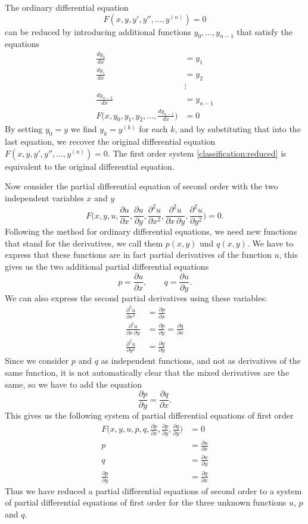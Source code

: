 The ordinary differential equation
\[
F(x,y,y',y'',\dots,y^{(n)})=0
\]
can be reduced by introducing additional functions 
$y_0,\dots,y_{n-1}$
that satisfy the equations
\begin{equation}
\begin{aligned}
\frac{dy_0}{dx}&=y_1\\
\frac{dy_1}{dx}&=y_2\\
&\vdots\\
\frac{dy_{n-2}}{dx}&=y_{n-1}\\
F\biggl(x,y_0,y_1,y_2,\dots,\frac{dy_{n-1}}{dx}\biggr)&=0
\end{aligned}
\label{classification:reduced}
\end{equation}
By setting $y_0=y$ we find
$y_k=y^{(k)}$ for each $k$, and by substituting that into the last
equation, we recover the original differential equation
$F(x,y,y',y'',\dots,y^{(n)})=0$.
The first order system \eqref{classification:reduced} is equivalent to the
original differential equation.

Now consider the partial differential equation of second order with
the two independent variables $x$ and $y$
\[
F\biggl(x,y,u,\frac{\partial u}{\partial x},\frac{\partial u}{\partial y},
\frac{\partial^2 u}{\partial x^2},\frac{\partial^2 u}{\partial x\,\partial y},
\frac{\partial^2u}{\partial y^2}\biggr)=0.
\]
Following the method for ordinary differential equations, we need new
functions that stand for the derivatives, we call them $p(x,y)$ und $q(x,y)$.
We have to express that these functions are in fact partial
derivatives of the function $u$, this gives us the two additional partial
differential equations
\[
p=\frac{\partial u}{\partial x},\qquad q=\frac{\partial u}{\partial y}.
\]
We can also express the second partial derivatives using these variables:
\begin{align*}
\frac{\partial^2 u}{\partial x^2}&=\frac{\partial p}{\partial x}\\
\frac{\partial^2 u}{\partial x\,\partial y}&=\frac{\partial p}{\partial y}=\frac{\partial q}{\partial x}\\
\frac{\partial^2 u}{\partial y^2}&=\frac{\partial q}{\partial y}
\end{align*}
Since we consider $p$ and $q$ as independent functions, and not as
derivatives of the same function, it is not automatically clear that 
the mixed derivatives are the same, so we have to add the equation
\[
\frac{\partial p}{\partial y}
=
\frac{\partial q}{\partial x}.
\]
This gives us the following system of partial differential equations
of first order
\begin{align*}
F\biggl(x,y,u,p,q,\frac{\partial p}{\partial x},\frac{\partial p}{\partial y},\frac{\partial q}{\partial y}\biggr)&=0\\
p&=\frac{\partial u}{\partial x}\\
q&=\frac{\partial u}{\partial y}\\
\frac{\partial p}{\partial y}&=\frac{\partial q}{\partial x}
\end{align*}
Thus we have reduced a partial differential equations of second order
to a system of partial differential equations of first order for 
the three unknown functions $u$, $p$ and $q$.

